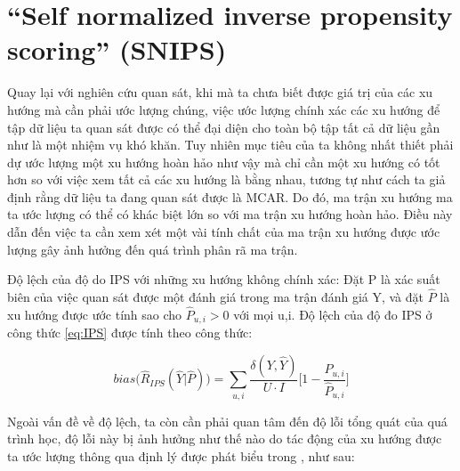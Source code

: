 \section{``Self normalized inverse propensity scoring'' (SNIPS)}

Quay lại với nghiên cứu quan sát, khi mà ta chưa biết được giá trị của các xu hướng mà cần phải ước lượng chúng, việc ước lượng chính xác các xu hướng để tập dữ liệu ta quan sát được có thể đại diện cho toàn bộ tập tất cả dữ liệu gần như là một nhiệm vụ khó khăn. Tuy nhiên mục tiêu của ta không nhất thiết phải dự ước lượng một xu hướng hoàn hảo như vậy mà chỉ cần một xu hướng có tốt hơn so với việc xem tất cả các xu hướng là bằng nhau, tương tự như cách ta giả định rằng dữ liệu ta đang quan sát được là MCAR. Do đó, ma trận xu hướng ma ta ước lượng có thể có khác biệt lớn so với ma trận xu hướng hoàn hảo. Điều này dẫn đến việc ta cần xem xét một vài tính chất của ma trận xu hướng được ước lượng gây ảnh hưởng đến quá trình phân rã ma trận.

\begin{lemma}
Độ lệch của độ do IPS với những xu hướng không chính xác: Đặt P là xác suất biên của việc quan sát được một đánh giá trong ma trận đánh giá Y, và đặt $\hat{P}$ là xu hướng được ước tính sao cho $\hat{P}_{u,i} > 0$ với mọi u,i. Độ lệch của độ đo IPS ở công thức \ref{eq:IPS} được tính theo công thức:

\begin{equation}
\label{eq:biasips}
bias\bigg (\hat{R}_{IPS}(\hat{Y}|\hat{P}) \bigg) = \sum_{u,i} \frac{\delta(Y, \hat{Y})}{U \cdot I} \Bigg[1-\frac{P_{u,i}}{\hat{P}_{u,i}}\Bigg]
\end{equation}
\end{lemma}

Ngoài vấn đề về độ lệch, ta còn cần phải quan tâm đến độ lỗi tổng quát của quá trình học, độ lỗi này bị ảnh hưởng như thế nào do tác động của xu hướng được ta ước lượng thông qua định lý được phát biểu trong \cite{IPS}, như sau:

